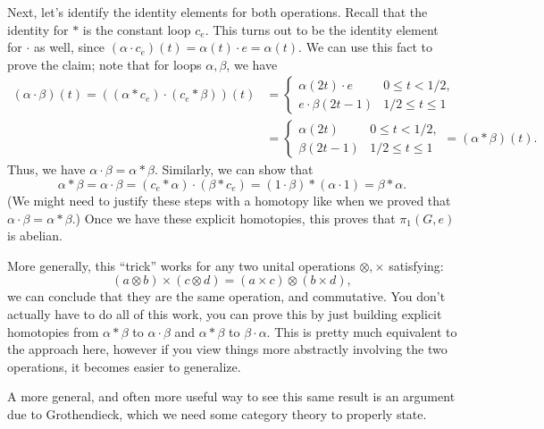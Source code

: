 \begin{solution}
    Next, let's identify the identity elements for both operations. Recall that the identity for $*$ is the constant loop $c_e$. This turns out to be the identity element for $\cdot$ as well, since $(\alpha \cdot c_e)(t) = \alpha(t)\cdot e = \alpha(t)$. We can use this fact to prove the claim; note that for loops $\alpha,\beta$, we have
    \[
        \begin{aligned}
            (\alpha\cdot \beta)(t) = ((\alpha * c_e) \cdot (c_e * \beta))(t) &= \begin{cases}\alpha(2t)\cdot e&0\leq t<1/2,\\ e\cdot \beta(2t-1)&1/2\leq t\leq 1\end{cases}\\
            &=     \begin{cases}
                                                                        \alpha(2t)&0\leq t<1/2,\\
                                                                    \beta(2t-1)& 1/2\leq t\leq 1\end{cases} = (\alpha * \beta)(t).
        \end{aligned}
    \]
    Thus, we have $\alpha \cdot \beta = \alpha * \beta$. Similarly, we can show that
    \[\alpha * \beta = \alpha\cdot \beta = (c_e * \alpha) \cdot (\beta * c_e) = (1\cdot \beta) * (\alpha \cdot 1) = \beta * \alpha.\]
    (We might need to justify these steps with a homotopy like when we proved that $\alpha \cdot \beta = \alpha * \beta$.) Once we have these explicit homotopies, this proves that $\pi_1(G, e)$ is abelian.
    
    More generally, this ``trick'' works for any two unital operations $\otimes, \times$ satisfying:
    \[
        (a\otimes b)\times (c\otimes d) = (a\times c)\otimes (b\times d),
    \]
    we can conclude that they are the same operation, and commutative. You don't actually have to do all of this work, you can prove this by just building explicit homotopies from $\alpha * \beta$ to $\alpha \cdot \beta$ and $\alpha * \beta$ to $\beta \cdot \alpha$. This is pretty much equivalent to the approach here, however if you view things more abstractly involving the two operations, it becomes easier to generalize.

    A more general, and often more useful way to see this same result is an argument due to Grothendieck, which we need some category theory to properly state.


\end{solution}
